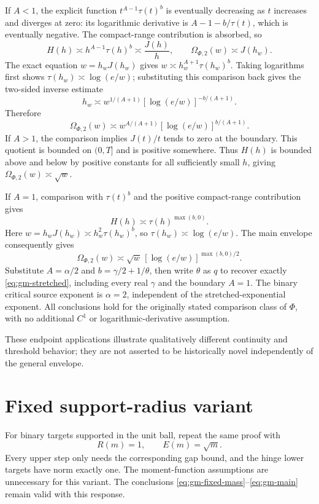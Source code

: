 If \(A<1\), the explicit function \(t^{A-1}\tau(t)^b\) is eventually decreasing as \(t\) increases and diverges at zero: its logarithmic derivative is \(A-1-b/\tau(t)\), which is eventually negative. The compact-range contribution is absorbed, so
\[
 H(h)\asymp h^{A-1}\tau(h)^b\asymp\frac{J(h)}h,
 \qquad \Omega_{\Phi,2}(w)\asymp J(h_w).
\]
The exact equation \(w=h_wJ(h_w)\) gives \(w\asymp h_w^{A+1}\tau(h_w)^b\). Taking logarithms first shows \(\tau(h_w)\asymp\log(e/w)\); substituting this comparison back gives the two-sided inverse estimate
\[
 h_w\asymp w^{1/(A+1)}[\log(e/w)]^{-b/(A+1)}.
\]
Therefore
\[
 \Omega_{\Phi,2}(w)\asymp
 w^{A/(A+1)}[\log(e/w)]^{b/(A+1)}.
\]
If \(A>1\), the comparison implies \(J(t)/t\) tends to zero at the boundary. This quotient is bounded on \((0,T]\) and is positive somewhere. Thus \(H(h)\) is bounded above and below by positive constants for all sufficiently small \(h\), giving \(\Omega_{\Phi,2}(w)\asymp\sqrt w\).

If \(A=1\), comparison with \(\tau(t)^b\) and the positive compact-range contribution gives
\[
 H(h)\asymp\tau(h)^{\max(b,0)}.
\]
Here \(w=h_wJ(h_w)\asymp h_w^2\tau(h_w)^b\), so \(\tau(h_w)\asymp\log(e/w)\). The main envelope consequently gives
\[
 \Omega_{\Phi,2}(w)\asymp\sqrt w\,[\log(e/w)]^{\max(b,0)/2}.
\]
Substitute \(A=\alpha/2\) and \(b=\gamma/2+1/\theta\), then write \(\theta\) as \(q\) to recover exactly \eqref{eq:gm-stretched}, including every real \(\gamma\) and the boundary \(A=1\). The binary critical source exponent is \(\alpha=2\), independent of the stretched-exponential exponent. All conclusions hold for the originally stated comparison class of \(\Phi\), with no additional \(C^1\) or logarithmic-derivative assumption.

These endpoint applications illustrate qualitatively different continuity and threshold behavior; they are not asserted to be historically novel independently of the general envelope.

\section{Fixed support-radius variant}\label{sec:gm-bounded}

For binary targets supported in the unit ball, repeat the same proof with
\[
 R(m)=1,\qquad E(m)=\sqrt m.
\]
Every upper step only needs the corresponding gap bound, and the hinge lower targets have norm exactly one. The moment-function assumptions are unnecessary for this variant. The conclusions \eqref{eq:gm-fixed-mass}--\eqref{eq:gm-main} remain valid with this response.


